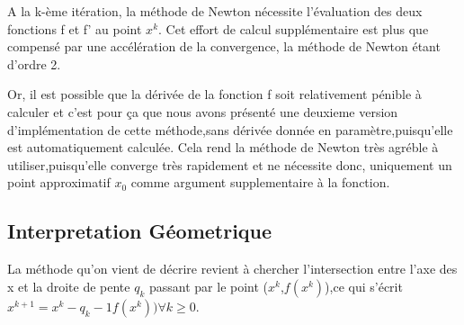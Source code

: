 \documentclass{article}
\begin{document}
A la k-ème itération, la méthode de Newton nécessite l’évaluation des deux fonctions f et f' au point $x^k$. Cet effort de calcul supplémentaire est plus
que compensé par une accélération de la convergence, la méthode de Newton étant d’ordre 2. 

Or, il est possible que la dérivée de la fonction f soit relativement pénible à calculer et c'est pour ça que nous avons présenté une deuxieme version d'implémentation de cette méthode,sans dérivée donnée en paramètre,puisqu'elle est automatiquement calculée.
Cela rend la méthode de Newton très agréble à utiliser,puisqu'elle converge très rapidement et ne nécessite donc, uniquement un point approximatif $x_0$ comme argument supplementaire à la fonction.


\subsection{Interpretation Géometrique}
La méthode qu’on vient de décrire revient à chercher l’intersection entre
l’axe des x et la droite de pente $q_k$ passant par le point ($x^k$,$f(x^k)$),ce qui s’écrit
$x^{k+1} = x^k−q_k − 1 f(x^k) ) \forall k \geq 0 $.
\end{document}
